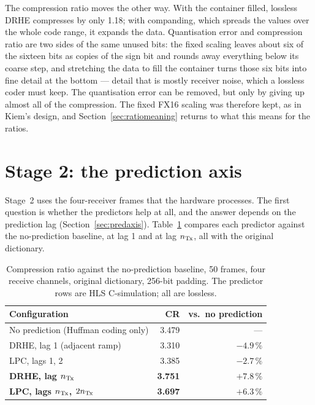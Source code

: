 The compression ratio moves the other way. With the container filled, lossless
DRHE compresses by only \num{1.18}; with companding, which spreads the values
over the whole code range, it expands the data. Quantisation error and
compression ratio are two sides of the same unused bits: the fixed scaling
leaves about six of the sixteen bits as copies of the sign bit and rounds
away everything below its coarse step, and stretching the data to fill the
container turns those six bits into fine detail at the bottom --- detail that is
mostly receiver noise, which a lossless coder must keep. The quantisation error
can be removed, but only by giving up almost all of the compression. The fixed
FX16 scaling was therefore kept, as in Kiem's design, and
Section~\ref{sec:ratiomeaning} returns to what this means for the ratios.

\section{Stage 2: the prediction axis}
\label{sec:predaxisres}

Stage~2 uses the four-receiver frames that the hardware processes. The first
question is whether the predictors help at all, and the answer depends on the
prediction lag (Section~\ref{sec:predaxis}). Table~\ref{tab:predaxis} compares
each predictor against the no-prediction baseline, at lag 1 and at lag $n_{\mathrm{Tx}}$,
all with the original dictionary.

\begin{table}[htbp]
\centering
\caption[The prediction lag]{Compression ratio against the no-prediction
baseline, 50 frames, four receive channels, original dictionary, 256-bit
padding. The predictor rows are HLS C-simulation; all are lossless.}
\label{tab:predaxis}
\small
\begin{tabular}{@{}lrr@{}}
\toprule
Configuration & CR & vs.\ no prediction\\
\midrule
No prediction (Huffman coding only)            & \num{3.479} & ---\\
DRHE, lag 1 (adjacent ramp)                    & \num{3.310} & $-4.9\,\%$\\
LPC, lags 1, 2                                 & \num{3.385} & $-2.7\,\%$\\
\textbf{DRHE, lag $n_{\mathrm{Tx}}$}                      & \textbf{\num{3.751}} & $\mathbf{+7.8\,\%}$\\
\textbf{LPC, lags $n_{\mathrm{Tx}}$, $2n_{\mathrm{Tx}}$}             & \textbf{\num{3.697}} & $\mathbf{+6.3\,\%}$\\
\bottomrule
\end{tabular}
\end{table}

